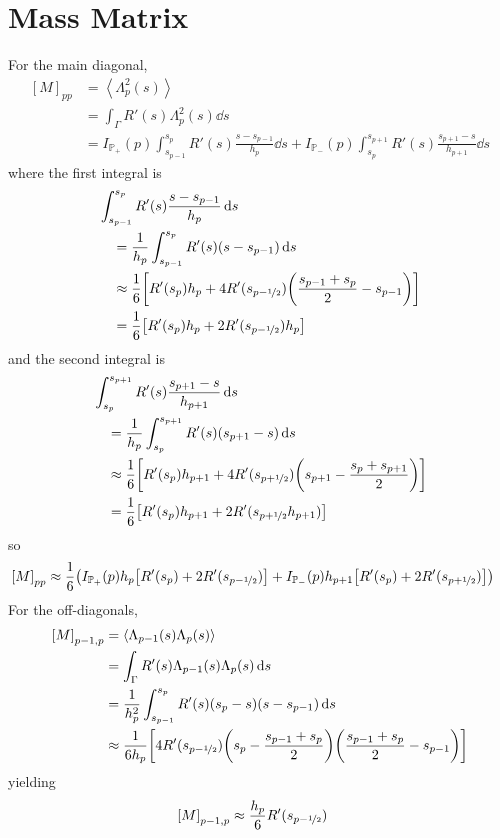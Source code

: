 \documentclass{report}
\newcommand\Par[1]{{ \left({#1}\right) }}
\newcommand\Brack[1]{{ \left[{#1}\right] }}
\newcommand\Angle[1]{{ \left\langle{#1}\right\rangle }}
\newcommand\nf[2]{{ \nicefrac{#1}{#2} }}
\newcommand\bbP{{ \mathbb{P} }}
\newcommand\R{{ R' }}
\begin{document}
\section{Mass Matrix}
For the main diagonal,
\begin{align*}
	\Brack{M}_{pp} &= \Angle{\Lambda_p^2(s)} \\
	&= \int_\Gamma \R(s) \Lambda_p^2(s) \dd{s} \\
	&= I_{\bbP_+}(p) \int_{s_{p-1}}^{s_p} \R(s) \frac{s - s_{p-1}}{h_p} \dd{s} + I_{\bbP_-}(p) \int_{s_p}^{s_{p+1}} \R(s) \frac{s_{p+1} - s}{h_{p+1}} \dd{s}
\end{align*}
where the first integral is
\begin{align*}
	& \int_{s_{p-1}}^{s_p} \R(s) \frac{s - s_{p-1}}{h_p} \dd{s} \\
	&\quad = \frac{1}{h_p} \int_{s_{p-1}}^{s_p} \R(s) \Par{s - s_{p-1}} \dd{s} \\
	&\quad \approx \frac{1}{6} \Brack{
		\R(s_p) h_p
		+ 4 \R(s_{p-\nf12}) \Par{\frac{s_{p-1} + s_p}{2} - s_{p-1}}
	} \\
	&\quad = \frac{1}{6} \Brack{
		\R(s_p) h_p + 2 \R(s_{p-\nf12}) h_p
	}
\end{align*}
and the second integral is
\begin{align*}
	& \int_{s_p}^{s_{p+1}} \R(s) \frac{s_{p+1} - s}{h_{p+1}} \dd{s} \\
	&\quad = \frac{1}{h_p} \int_{s_p}^{s_{p+1}} \R(s) \Par{s_{p+1} - s} \dd{s} \\
	&\quad \approx \frac{1}{6} \Brack{
		\R(s_p) h_{p+1}
		+ 4 \R(s_{p+\nf12}) \Par{s_{p+1} - \frac{s_p + s_{p+1}}{2}}
	} \\
	&\quad = \frac{1}{6} \Brack{
		\R(s_p) h_{p+1} + 2 \R(s_{p+\nf12} h_{p+1})
	}
\end{align*}
so
\begin{align*}
	\Brack{M}_{pp} &\approx \frac{1}{6} \Par{I_{\bbP_+}(p) h_p \Brack{
		\R(s_p) + 2 \R(s_{p-\nf12})
	} + I_{\bbP_-}(p) h_{p+1} \Brack{
		\R(s_p) + 2 \R(s_{p+\nf12} )
	}}
\end{align*}
For the off-diagonals,
\begin{align*}
	\Brack{M}_{p-1, p} &= \Angle{\Lambda_{p-1}(s) \Lambda_p(s)} \\
	&= \int_\Gamma \R(s) \Lambda_{p-1}(s) \Lambda_p(s) \dd{s} \\
	&= \frac{1}{h_p^2} \int_{s_{p-1}}^{s_p} \R(s) \Par{s_p - s} \Par{s - s_{p-1}} \dd{s} \\
	&\approx \frac{1}{6h_p} \Brack{
		4 \R(s_{p-\nf12}) \Par{s_p - \frac{s_{p-1} + s_p}{2}} \Par{\frac{s_{p-1} + s_p}{2} - s_{p-1}}
	}
\end{align*}
yielding
\begin{align*}
	\Brack{M}_{p-1, p} &\approx \frac{h_p}{6} \R(s_{p-\nf12})
\end{align*}
\end{document}
